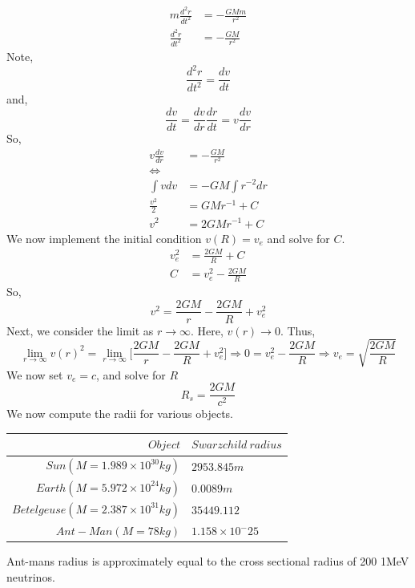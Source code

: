 \documentclass[letterpaper,10pt]{article}
\begin{document}
\begin{enumerate}
\begin{align*}
m\frac{d^2r}{dt^2} &= -\frac{GMm}{r^2}\\
\frac{d^2r}{dt^2} &= -\frac{GM}{r^2}
\end{align*}
Note,
\[\frac{d^2 r}{dt^2}=\frac{dv}{dt}\]
and,
\[\frac{dv}{dt}=\frac{dv}{dr}\frac{dr}{dt}=v\frac{dv}{dr}\]
So,
\begin{align*}
v\frac{dv}{dr} &=-\frac{GM}{r^2} \\
\Leftrightarrow & \\
\int vdv &= -GM\int r^{-2}dr\\
\frac{v^2}{2}&=GMr^{-1}+C\\
v^2&=2GMr^{-1}+C
\end{align*}
We now implement the initial condition $v(R)=v_e$ and solve for $C$.
\begin{align*}
v_e^2 &= \frac{2GM}{R}+C\\
C&=v_e^2-\frac{2GM}{R}
\end{align*}
So,
\[v^2=\frac{2GM}{r}-\frac{2GM}{R}+v_e^2\]
Next, we consider the limit as $r\to\infty$. Here, $v(r)\to 0$. Thus,
\[\lim_{r\to\infty} v(r)^2= \lim_{r\to\infty}\bigg[\frac{2GM}{r}-\frac{2GM}{R}+v_e^2\bigg]\Rightarrow 0=v_e^2-\frac{2GM}{R}\Rightarrow v_e=\sqrt{\frac{2GM}{R}}\]
We now set $v_e=c$, and solve for $R$
\[R_s=\frac{2GM}{c^2}\]
We now compute the radii for various objects.\\
\begin{center}
\begin{tabular}{|r|l|}
\hline
$Object$ & $Swarzchild\ radius$\\\hline \hline
$Sun (M=1.989\times 10^{30} kg)$ & $2953.845m$ \\\hline
$Earth (M=5.972\times 10^{24}kg)$ & $0.0089m$\\\hline
$Betelgeuse (M=2.387\times 10^{31}kg)$ & $35449.112$ \\\hline
$Ant-Man (M=78kg)$ & $1.158\times 10^-25$\\\hline
\end{tabular}
\end{center}
Ant-mans radius is approximately equal to the cross sectional radius of 200 1MeV neutrinos.
\end{enumerate}
\end{document}
